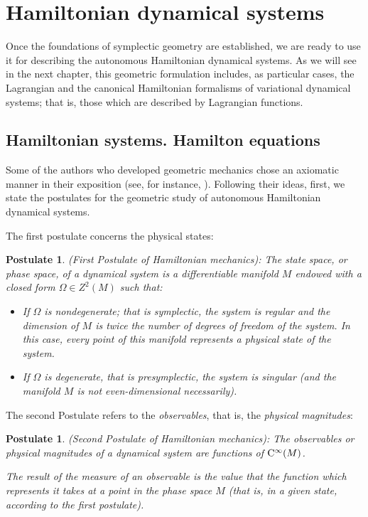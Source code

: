 \documentclass[12pt]{report}
\newtheorem{pos}[teor]{Postulate}
\def\bit{\begin{itemize}}
\def\eit{\end{itemize}}
\def\Cinfty{{\rm C}^\infty}
\begin{document}
\section{Hamiltonian dynamical systems}


Once the foundations of symplectic geometry are established,
we are ready to use it for describing the autonomous Hamiltonian dynamical systems.
As we will see in the next chapter, this geometric formulation includes, as particular cases, 
the Lagrangian and the canonical Hamiltonian formalisms of variational dynamical systems;
that is, those which are described by Lagrangian functions.


\subsection{Hamiltonian systems. Hamilton equations}
\protect\label{shreh}


Some of the authors who developed geometric mechanics chose an axiomatic manner in their exposition
(see, for instance, \cite{So-ssd}).
Following their ideas, first, we state the postulates
for the geometric study of autonomous Hamiltonian dynamical systems.

The first postulate concerns the physical states:
\begin{pos}
{\rm (First Postulate of Hamiltonian mechanics\/)}:
The state space, or phase space, of a dynamical system 
is a differentiable manifold $M$ endowed with a closed form
$\Omega\in Z^2(M)$ such that:
\bit
\item
If $\Omega$ is nondegenerate; that is {\sl symplectic},
the system is {\sl regular} and the dimension of $M$
is twice the number of degrees of freedom of the system.
In this case, every point of this manifold represents a physical state of the system.
\item
If $\Omega$ is degenerate, that is {\sl presymplectic},
the system is {\sl singular} (and the manifold $M$ 
is not even-dimensional necessarily).
\eit
\label{ax1}
\end{pos}

The second Postulate refers to the {\sl  observables},
that is,  the {\sl physical magnitudes}:

\begin{pos}
{\rm (Second Postulate of Hamiltonian mechanics\/)}:
The observables or physical magnitudes of a  dynamical  system
are functions of $\Cinfty (M)$.

The result of the measure of an observable
is the value that the function which represents it takes 
at a point in the phase space $M$
(that is, in a given state, according to the first postulate).
\label{ax2}
\end{pos}
\end{document}
